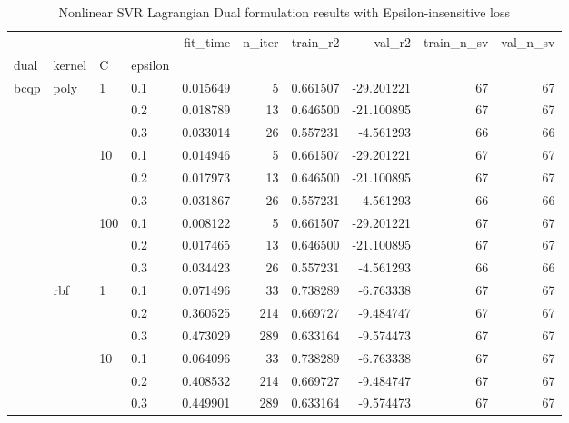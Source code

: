 \begin{table}[h!]
\centering
\caption{Nonlinear SVR Lagrangian Dual formulation results with Epsilon-insensitive loss}
\label{nonlinear_lagrangian_dual_svr_cv_results}
\begin{tabular}{llllrrrrrr}
\toprule
   &     &     &     &  fit\_time &  n\_iter &  train\_r2 &     val\_r2 &  train\_n\_sv &  val\_n\_sv \\
dual & kernel & C & epsilon &           &         &           &            &             &           \\
\midrule
bcqp & poly & 1   & 0.1 &  0.015649 &       5 &  0.661507 & -29.201221 &          67 &        67 \\
   &     &     & 0.2 &  0.018789 &      13 &  0.646500 & -21.100895 &          67 &        67 \\
   &     &     & 0.3 &  0.033014 &      26 &  0.557231 &  -4.561293 &          66 &        66 \\
   &     & 10  & 0.1 &  0.014946 &       5 &  0.661507 & -29.201221 &          67 &        67 \\
   &     &     & 0.2 &  0.017973 &      13 &  0.646500 & -21.100895 &          67 &        67 \\
   &     &     & 0.3 &  0.031867 &      26 &  0.557231 &  -4.561293 &          66 &        66 \\
   &     & 100 & 0.1 &  0.008122 &       5 &  0.661507 & -29.201221 &          67 &        67 \\
   &     &     & 0.2 &  0.017465 &      13 &  0.646500 & -21.100895 &          67 &        67 \\
   &     &     & 0.3 &  0.034423 &      26 &  0.557231 &  -4.561293 &          66 &        66 \\
   & rbf & 1   & 0.1 &  0.071496 &      33 &  0.738289 &  -6.763338 &          67 &        67 \\
   &     &     & 0.2 &  0.360525 &     214 &  0.669727 &  -9.484747 &          67 &        67 \\
   &     &     & 0.3 &  0.473029 &     289 &  0.633164 &  -9.574473 &          67 &        67 \\
   &     & 10  & 0.1 &  0.064096 &      33 &  0.738289 &  -6.763338 &          67 &        67 \\
   &     &     & 0.2 &  0.408532 &     214 &  0.669727 &  -9.484747 &          67 &        67 \\
   &     &     & 0.3 &  0.449901 &     289 &  0.633164 &  -9.574473 &          67 &        67 \\

\end{tabular}
\end{table}
